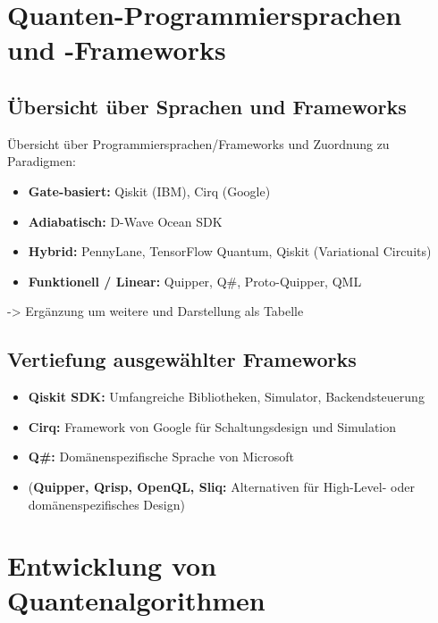 \section{Quanten-Programmiersprachen und -Frameworks}

\subsection{Übersicht über Sprachen und Frameworks}

Übersicht über Programmiersprachen/Frameworks und Zuordnung zu Paradigmen:

\begin{itemize}
    \item \textbf{Gate-basiert:} Qiskit (IBM), Cirq (Google)
    \item \textbf{Adiabatisch:} D-Wave Ocean SDK
    \item \textbf{Hybrid:} PennyLane, TensorFlow Quantum, Qiskit (Variational Circuits)
    \item \textbf{Funktionell / Linear:} Quipper, Q\#, Proto-Quipper, QML
\end{itemize}
-> Ergänzung um weitere und Darstellung als Tabelle

\subsection{Vertiefung ausgewählter Frameworks}
\begin{itemize}
    \item \textbf{Qiskit SDK:} Umfangreiche Bibliotheken, Simulator, Backendsteuerung
    \item \textbf{Cirq:} Framework von Google für Schaltungsdesign und Simulation
    \item \textbf{Q\#:} Domänenspezifische Sprache von Microsoft
    \item (\textbf{Quipper, Qrisp, OpenQL, Sliq:} Alternativen für High-Level- oder domänenspezifisches Design)
\end{itemize}

\section{Entwicklung von Quantenalgorithmen}


